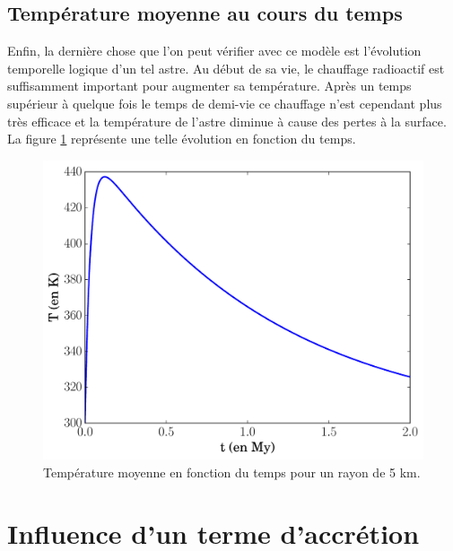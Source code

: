 \documentclass[10pt,a4paper]{article}
\numberwithin{equation}{section}
\begin{document}
\subsection{Température moyenne au cours du temps}
Enfin, la dernière chose que l'on peut vérifier avec ce modèle est l'évolution temporelle logique d'un tel astre. Au début de sa vie, le chauffage radioactif est suffisamment important pour augmenter sa température. Après un temps supérieur à quelque fois le temps de demi-vie ce chauffage n'est cependant plus très efficace et la température de l'astre diminue à cause des pertes à la surface. La figure \ref{tempMoy} représente une telle évolution en fonction du temps.
\begin{figure}[h]
    \centering	    
	\includegraphics[scale=0.43]{figures/tempMoy.pdf}
    \caption{Température moyenne en fonction du temps pour un rayon de 5 km.}
    	\label{tempMoy} 
\end{figure}

\newpage
\section{Influence d'un terme d'accrétion}
\end{document}
